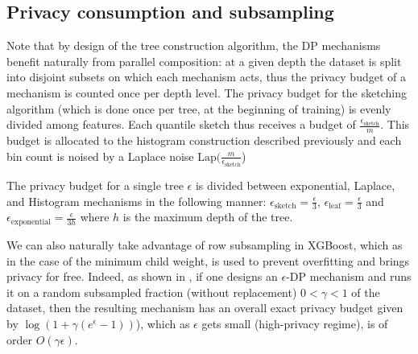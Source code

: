 \documentclass{article}
\theoremstyle{definition}
\begin{document}
\subsection{Privacy consumption and subsampling} 

Note that by design of the tree construction algorithm, the DP mechanisms benefit naturally from parallel composition: at a given depth the dataset is split into disjoint subsets on which each mechanism acts, thus the privacy budget of a mechanism is counted once per depth level. The privacy budget for the sketching algorithm (which is done once per tree, at the beginning of training) is evenly divided among features. Each quantile sketch thus receives a budget of $ \frac{ \epsilon_{\text{sketch}} }{m}$. This budget is allocated to the histogram construction described previously and each bin count is noised by a Laplace noise $\text{Lap}( \frac{m}{\epsilon_{\text{sketch}}}$) \smallskip 

The privacy budget for a single tree $\epsilon$ is divided between exponential, Laplace, and Histogram mechanisms in the following manner: $\epsilon_{\text{sketch}} = \frac{\epsilon}{3}$, $\epsilon_{\text{leaf}} = \frac{\epsilon}{3}$ and $\epsilon_{\text{exponential}} = \frac{\epsilon}{3 h}$ where $h$ is the maximum depth of the tree. \smallskip 

We can also naturally take advantage of row subsampling in XGBoost, which as in the case of the minimum child weight, is used to prevent overfitting and brings privacy for free. Indeed, as shown in \cite{balle2018subsampling}, if one designs an $\epsilon$-DP mechanism and runs it on a random subsampled fraction (without replacement) $0 < \gamma < 1$ of the dataset, then the resulting mechanism has an overall exact privacy budget given by $\log\left(1 + \gamma(e^{\epsilon} - 1)\right)$), which as $\epsilon$ gets small (high-privacy regime), is of order $O(\gamma \epsilon)$.  

\end{document}
